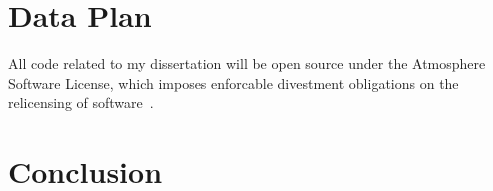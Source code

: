 \documentclass{article}
\begin{document}
\section{Data Plan}
\label{Sec:DataPlan}
All code related to my dissertation will be open source under the Atmosphere Software License, which imposes enforcable divestment obligations on the relicensing of software~\cite{atmospherelicense}. 
\section{Conclusion}




\end{document}
